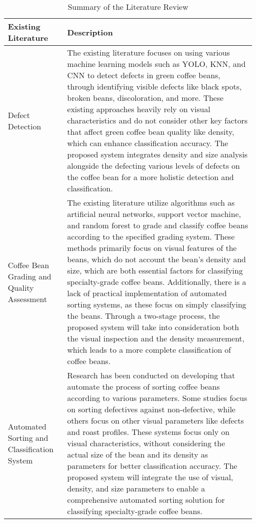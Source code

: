 \begin{center}
    \begin{longtable}{| p{4cm} | p{10cm} |}
	\caption{Summary of the Literature Review}
	\label{summary_literature_review}
	\endfirsthead
	\endhead
    \hline
    Existing Literature & Description \\ \hline
    Defect Detection & The existing literature focuses on using various machine learning models such as YOLO, KNN, and CNN to detect defects in green coffee beans, 
	through identifying visible defects like black spots, broken beans, discoloration, and more. These existing approaches heavily rely on visual characteristics 
	and do not consider other key factors that affect green coffee bean quality like density, which can enhance classification accuracy. The proposed system 
	integrates density and size analysis alongside the defecting various levels of defects on the coffee bean for a more holistic detection and classification. \\ \hline
    Coffee Bean Grading and Quality Assessment & The existing literature utilize algorithms such as artificial neural networks, support vector machine, and random 
	forest to grade and classify coffee beans according to the specified grading system. These methods primarily focus on visual features of the beans, 
	which do not account the bean’s density and size, which are both essential factors for classifying specialty-grade coffee beans. Additionally, there is a lack of 
	practical implementation of automated sorting systems, as these focus on simply classifying the beans. Through a two-stage process, the proposed system will 
	take into consideration both the visual inspection and the density measurement, which leads to a more complete classification of coffee beans. \\ \hline
    Automated Sorting and Classification System & Research has been conducted on developing that automate the process of sorting coffee beans according to various parameters. 
	Some studies focus on sorting defectives against non-defective, while others focus on other visual parameters like defects and roast profiles. These systems focus only on visual 
	characteristics, without considering the actual size of the bean and its density as parameters for better classification accuracy. The proposed system will integrate the use of visual, density, and size parameters to enable a comprehensive automated sorting solution for classifying specialty-grade coffee beans. \\
    \hline
    \end{longtable}
\end{center}

